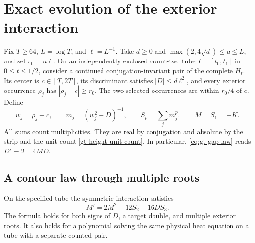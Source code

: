 \section{Exact evolution of the exterior interaction}
\label{sec:gt-interaction}

Fix \(T\ge64\), \(L=\log T\), and \(\ell=L^{-1}\). Take \(d\ge0\)
and \(\max(2,4\sqrt d)\le a\le L\), and set \(r_0=a\ell\).
On an independently enclosed count-two tube \(I=[t_0,t_1]\)
in \(0\le t\le 1/2\), consider a continued conjugation-invariant
pair of the complete \(H_t\). Its center is \(c\in[T,2T]\),
its discriminant satisfies \(|D|\le d\ell^2\), and every exterior
occurrence \(\rho_j\) has \(|\rho_j-c|\ge r_0\). The two
selected occurrences are within \(r_0/4\) of \(c\). Define
\[
 w_j=\rho_j-c,\qquad m_j=(w_j^2-D)^{-1},\qquad
 S_p=\sum_j m_j^p,\qquad M=S_1=-K .
\]
All sums count multiplicities. They are real by conjugation and
absolute by the strip and the unit count \eqref{gt-height-unit-count}.
In particular, \eqref{eq:gt-gap-law} reads \(D'=2-4MD\).

\subsection{A contour law through multiple roots}

\begin{theorem}
\label{gt-interaction-evolution}
On the specified tube the symmetric interaction satisfies
\begin{equation}
 M'=2M^2-12S_2-16DS_3 .
 \label{gt-interaction-law}
\end{equation}
The formula holds for both signs of \(D\), a target double, and
multiple exterior roots. It also holds for a polynomial solving the
same physical heat equation on a tube with a separate counted pair.
\end{theorem}

